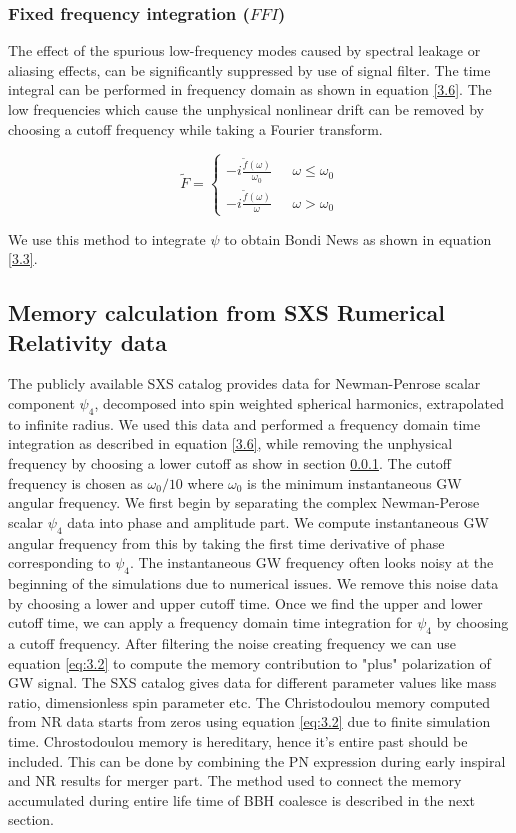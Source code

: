 \documentclass[twocolumn,showpacs,aps,prd,nobibnotes,floatfix]{revtex4-1}
\begin{document}
\subsubsection{Fixed frequency integration ($\mathit{FFI}$)}\label{FFI}
The effect of the spurious low-frequency modes caused by spectral leakage or aliasing effects, can be significantly suppressed by use of signal filter. The time integral can be performed in frequency domain as shown in equation \ref{3.6}. The low frequencies which cause the unphysical nonlinear drift can be removed by choosing a cutoff frequency while taking a Fourier transform.   

\[\tilde{F} =
\begin{cases}
-\mathit{i} \frac{\tilde{f}(\omega)}{\omega_0} & \text{ $\omega\leq\omega_0$} \\
-\mathit{i} \frac{\tilde{f}(\omega)}{\omega} & \text{ $\omega>\omega_0$} 
\end{cases}\]

We use this method to integrate $\psi$ to obtain Bondi News as shown in equation \ref{3.3}.

\subsection{Memory calculation from SXS Rumerical Relativity data}
The publicly available SXS catalog provides data for Newman-Penrose scalar component $\psi_4$, decomposed into spin weighted spherical harmonics, extrapolated to infinite radius. We used this data and  performed a frequency domain time integration as described in equation \ref{3.6}, while removing the unphysical frequency by choosing a lower cutoff as show in section \ref{FFI}. The cutoff frequency is chosen as $\omega_0/10$ where $\omega_0$ is the minimum instantaneous GW angular frequency. We first begin by separating the complex Newman-Perose scalar $\psi_4$ data into phase and amplitude part. We compute instantaneous GW angular frequency from this by taking the first time derivative of phase corresponding to $\psi_4$. The instantaneous GW frequency often looks noisy at the beginning of the simulations due to numerical issues. We remove this noise data by choosing a lower and upper cutoff time. Once we find the upper and lower cutoff time, we can apply a frequency domain time integration for $\psi_4$ by choosing a cutoff frequency. After filtering the noise creating frequency we can use equation \ref{eq:3.2} to compute the memory contribution to "plus" polarization of GW signal. The SXS catalog gives data for different parameter values like mass ratio, dimensionless spin parameter etc. The Christodoulou memory computed from NR data starts from zeros using equation \ref{eq:3.2} due to finite simulation time. Chrostodoulou memory is hereditary, hence it's entire past should be included. This can be done by combining the PN expression during early inspiral and NR results for merger part. The method used to connect the memory accumulated during entire life time of BBH coalesce is described in the next section. 
\end{document}

